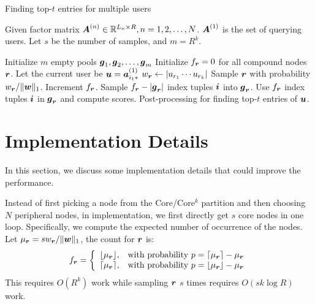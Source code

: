 \documentclass[10pt,journal,compsoc]{IEEEtran}
\newcommand{\V}[1]{{\boldsymbol{{\MakeLowercase{#1}}}}}
\newcommand{\RowVecA}[1]{\V{a}^{(#1)}_{i_#1*}}
\newcommand{\M}[1]{{\boldsymbol{{\MakeUppercase{#1}}}}}
\newcommand{\FacMat}[2]{\M{#1}^{(#2)}}
\newcommand{\norm}[2]{\|#1\|_{#2}}
\begin{document}
\begin{algorithm}[!ht]
	\caption{Finding top-$t$ entries for multiple users}
	\label{alg:QuerySampling}
	Given factor matrix $\FacMat{A}{n}\in \mathbb{R}^{L_n\times R}, n = 1,2,\ldots,N$.
	$\FacMat{A}{1}$ is the set of querying users.
	Let $s$ be the number of samples, and $m=R^k$.
	\begin{algorithmic}[1]
		\State Initialize $m$ empty pools $\V{g}_1,\V{g}_2,\ldots,\V{g}_m$
		\State Initialize $f_{\V{r}} = 0$ for all compound nodes $\V{r}$.
		\State Let the current user be $\V{u}=\RowVecA{1}$
		\ForAll{$\V{r}=(r_1,\ldots,r_k)$}
		\State $w_\V{r} \leftarrow |u_{r_1}\cdots u_{r_k}|$
		\EndFor
		\State Sample $\V{r}$ with probability $w_\V{r}/\norm{\V{W}}{1}$.
		\label{line:Indexes}
		\State  Increment $f_{\V{r}}$.
		\EndFor
		\ForAll {$\V{r}$}
		\If {$f_\V{r} > |\V{g}_\V{r}|$ }
		\State Sample $f_{\V{r}} - |\V{g}_{\V{r}}|$ index tuples $\V{i}$ into $\V{g}_{\V{r}}$.
		\EndIf
		\State Use $f_{\V{r}}$ index tuples $\V{i}$ in $\V{g}_{\V{r}}$ and compute scores.
		\EndFor
		\State Post-processing for finding top-$t$ entries of $\V{u}$.
		\EndFor
	\end{algorithmic}
\end{algorithm}

\section{Implementation Details}
In this section, we discuss some implementation details that could improve the performance.

Instead of first picking a node from the Core/Core$^k$ partition
and then choosing $N$ peripheral nodes,
in implementation, we first directly get $s$ core nodes in one loop.
Specifically, we compute the expected number of occurrence of the nodes.
Let $\mu_{\V{r}}=sw_\V{r}/\norm{\V{w}}{1}$, the count for $\V{r}$ is:
\begin{equation}f_\V{r}=
\left\{
\begin{array}{ll}
	\lfloor \mu_{\V{r}} \rfloor, & \hbox {with probability $p=\lceil \mu_{\V{r}} \rceil - \mu_{\V{r}}$}  \\
	\lceil \mu_{\V{r}} \rceil,   & \hbox{with probability $p=\lfloor \mu_{\V{r}} \rfloor - \mu_{\V{r}}$}
\end{array}
\right.
\end{equation}
This requires $O(R^k)$ work while sampling $\V{r}$ $s$ times requires $O(sk\log R)$ work.
\end{document}
